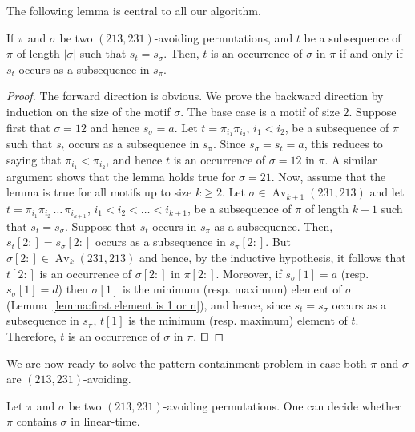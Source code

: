 \documentclass[a4paper]{llncs}
\DeclareMathOperator{\Avd}{Av}
\newcommand\Av[2]{\Avd_{{#1}}({#2})}
\begin{document}
The following lemma is central to all our algorithm.

\begin{lemma}
\label{lemma:MatchStripeToPermutation}
If $\pi$ and $\sigma$ be two $(213,231)$-avoiding permutations,
and $t$ be a subsequence of $\pi$ of length $|\sigma|$ such that $s_t = s_\sigma$.
Then, $t$ is an occurrence of $\sigma$ in $\pi$ if and only if
$s_t$ occurs as a subsequence in $s_\pi$.
\end{lemma}

\begin{proof}
  The forward direction is obvious.
  We prove the backward direction by induction on the size of the motif
  $\sigma$.
  The base case is a motif of size $2$.
  Suppose first that $\sigma = 12$ and hence $s_\sigma = a$.
  Let $t = \pi_{i_1}\pi_{i_2}$, $i_1 < i_2$, be a subsequence of $\pi$
  such that $s_t$ occurs as a subsequence in $s_\pi$.
  Since $s_\sigma = s_t = a$, this reduces to saying that
  $\pi_{i_1} < \pi_{i_2}$, and hence $t$ is an occurrence of $\sigma = 12$ in $\pi$.
  A similar argument shows that the lemma holds true for $\sigma = 21$.
  Now, assume that the lemma is true for all motifs up to size $k \geq 2$.
  Let $\sigma \in \Av{k+1}{231,213}$ and
  let $t = \pi_{i_1}\pi_{i_2}\,\ldots\,\pi_{i_{k+1}}$,
  $i_1 < i_2 < \ldots < i_{k+1}$,
  be a subsequence of $\pi$ of length $k+1$ such that
  $s_t = s_\sigma$.
  Suppose that $s_t$ occurs in $s_\pi$ as a subsequence.
  Then, $s_t[2:] = s_\sigma[2:]$ occurs as a subsequence in $s_\pi[2:]$.
  But $\sigma[2:] \in \Av{k}{231,213}$ and hence,
  by the inductive hypothesis, it follows that
  $t[2:]$ is an occurrence of $\sigma[2:]$ in $\pi[2:]$.
  Moreover, if $s_\sigma[1] = a$ (resp. $s_\sigma[1] = d$)
  then $\sigma[1]$ is the minimum (resp. maximum) element of $\sigma$
  (Lemma~\ref{lemma:first element is 1 or n}),
  and hence, since $s_t = s_\sigma$ occurs as a subsequence in $s_\pi$,
  $t[1]$ is the minimum (resp. maximum) element of $t$.
  Therefore, $t$ is an occurrence of $\sigma$ in $\pi$.
$\qed$
\end{proof}

We are now ready to solve the pattern containment problem in case
both $\pi$ and $\sigma$ are $(213, 231)$-avoiding.

\begin{proposition}
	Let $\pi$ and $\sigma$ be two $(213,231)$-avoiding permutations.
	One can decide whether $\pi$ contains $\sigma$ in linear-time.
\end{proposition}
\end{document}
